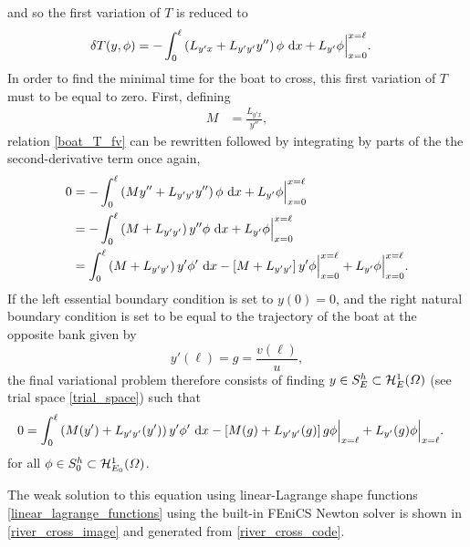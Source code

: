 and so the first variation of $T$ is reduced to
\begin{align}
  \label{boat_T_fv}
  \delta T(y,\phi) &= - \int_0^{\ell} \left( L_{y'x} + L_{y'y'} y'' \right) \phi \ \mathrm{d}x + L_{y'} \phi \Big|_{x=0}^{x=\ell}.
\end{align}
In order to find the minimal time for the boat to cross, this first variation of $T$ must to be equal to zero.  First, defining
\begin{align*}
  M &= \frac{L_{y'x}}{y''},
\end{align*}
relation \cref{boat_T_fv} can be rewritten followed by integrating by parts of the the second-derivative term once again,
{\footnotesize
\begin{align*}
  0 &= - \int_0^{\ell} \left( M y'' + L_{y'y'} y'' \right) \phi \ \mathrm{d}x + L_{y'} \phi \Big|_{x=0}^{x=\ell} \\
    &= - \int_0^{\ell} \left( M + L_{y'y'} \right) y'' \phi \ \mathrm{d}x + L_{y'} \phi \Big|_{x=0}^{x=\ell} \\
    &= \int_0^{\ell} \left( M + L_{y'y'} \right) y' \phi' \ \mathrm{d}x - \left[ M + L_{y'y'} \right] y' \phi \Big|_{x=0}^{x=\ell} + L_{y'} \phi \Big|_{x=0}^{x=\ell}.
\end{align*}}
If the left essential boundary condition is set to $y(0) = 0$, and the right natural boundary condition is set to be equal to the trajectory of the boat at the opposite bank given by
$$y'(\ell) = g = \frac{v(\ell)}{u},$$
the final variational problem therefore consists of finding $y \in S_E^h \subset \mathcal{H}_E^1(\varOmega)$ (see trial space \cref{trial_space}) such that
{\tiny
\begin{align*}
  0 &= \int_0^{\ell} \left( M(y') + L_{y'y'}(y') \right) y' \phi' \ \mathrm{d}x - \left[ M(g) + L_{y'y'}(g) \right] g \phi \Big|_{x=\ell} + L_{y'}(g) \phi \Big|_{x=\ell}.
\end{align*}}
for all $\phi \in S_0^h \subset \mathcal{H}_{E_0}^1(\varOmega)$.

The weak solution to this equation using linear-Lagrange shape functions \cref{linear_lagrange_functions} using the built-in FEniCS Newton solver is shown in \cref{river_cross_image} and generated from \cref{river_cross_code}.


